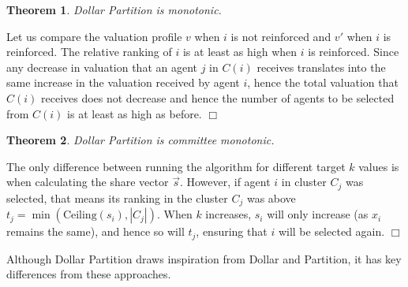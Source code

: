 \documentclass[letterpaper]{article}
\newtheorem{theorem}{Theorem}
\newtheorem{remark}{Remark}
\newcommand{\qed}{\unskip\hspace*{1em}\hspace{\fill}$\Box$}
\newenvironment{proof}[1][Proof]{\begin{trivlist}
 \item[\hskip \labelsep {\it #1:}]}{%
 \qed\end{trivlist}}
\newcommand{\nick}[1]{\textcolor{kentuckyblue}{\textbf{Nick Says: #1}}}
\begin{document}
		\begin{theorem}
			Dollar Partition is monotonic.
			\end{theorem}
			\begin{proof}

	Let us compare the valuation profile $v$ when $i$ is not reinforced and $v'$ when $i$ is reinforced.
The relative ranking of $i$ is at least as high when $i$ is reinforced. Since any decrease in valuation that an agent $j$ in $C(i)$ receives translates into the same increase in the valuation received by agent $i$, hence the total valuation that $C(i)$ receives does not decrease and hence the number of agents to be selected from $C(i)$ is at least as high as before.
\end{proof}

	\begin{theorem}
		Dollar Partition is committee monotonic.
		\end{theorem}
		\begin{proof}
The only difference between running the algorithm for different target $k$ values is when calculating the share vector $\vec{s}$. However, if agent $i$ in cluster $C_{j}$ was selected, that means its ranking in the cluster $C_{j}$ was above $t_{j}=\min(\text{Ceiling}(s_{i}),|C_{j}|)$. When $k$ increases, $s_{i}$ will only increase (as $x_{i}$ remains the same), and hence so will $t_{j}$, ensuring that $i$ will be selected again.%
			\end{proof}



Although Dollar Partition draws inspiration from Dollar and Partition, it has key differences from these approaches.
\end{document}
